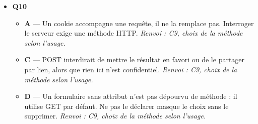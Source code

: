 \begin{itemize}
\begin{itemize}
  \end{itemize}
  \item \textbf{Q10}
  \begin{itemize}
    \item \textbf{A} — Un cookie accompagne une requête, il ne la remplace pas. Interroger le serveur exige une méthode HTTP. \emph{Renvoi : C9, choix de la méthode selon l'usage.}
    \item \textbf{C} — POST interdirait de mettre le résultat en favori ou de le partager par lien, alors que rien ici n'est confidentiel. \emph{Renvoi : C9, choix de la méthode selon l'usage.}
    \item \textbf{D} — Un formulaire sans attribut  n'est pas dépourvu de méthode : il utilise GET par défaut. Ne pas le déclarer masque le choix sans le supprimer. \emph{Renvoi : C9, choix de la méthode selon l'usage.}
  \end{itemize}
\end{itemize}
\fi
